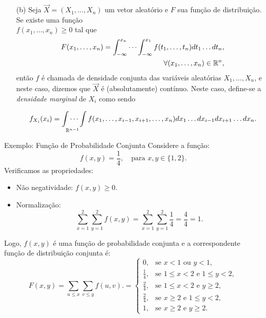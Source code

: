 \begin{frame}
\begin{block}{}

\begin{enumerate}
\item[(b)] Seja $\vec{X}=(X_1,\ldots,X_n)$ um vetor aleatório e $F$ sua função de distribuição. Se existe uma função\\
$f(x_1,\ldots,x_n)\geq 0$ tal que
\begin{eqnarray}
& & F(x_1,\ldots,x_n)=\int_{-\infty}^{x_n}\cdots\int_{-\infty}^{x_1}f(t_1,\ldots,t_n)dt_1\ldots dt_n, \nonumber\\
& &\forall(x_1,\ldots,x_n)\in \mathbb{R}^n,\nonumber
\end{eqnarray}
então $f$ é chamada de densidade conjunta das variáveis aleatórias $X_1,\ldots,X_n$, e neste caso, dizemos que $\vec{X}$ é (absolutamente) contínuo. Neste caso, define-se a {\em densidade marginal} de $X_i$ como sendo

\begin{eqnarray}
& & f_{X_i}(x_i)=\idotsint\limits_{\mathbb{R}^{n-1}} f(x_1,\ldots,x_{i-1},x_{i+1},\ldots,x_n)dx_1\ldots
dx_{i-1}dx_{i+1}\ldots dx_n. \nonumber
\end{eqnarray}
\end{enumerate}

\end{block}
\end{frame}

\begin{frame}{Exemplo: Função de Probabilidade Conjunta}
	Considere a função:
	\[
	f(x, y) = \frac{1}{4}, \quad \text{para } x, y \in \{1, 2\}.
	\]
	Verificamos as propriedades:
	\begin{itemize}
		\item Não negatividade: $f(x, y) \geq 0$.
		\item Normalização:
		\[
		\sum_{x=1}^{2} \sum_{y=1}^{2} f(x, y) = \sum_{x=1}^{2} \sum_{y=1}^{2} \frac{1}{4} = \frac{4}{4} = 1.
		\]
	\end{itemize}
	Logo, $f(x, y)$ é uma função de probabilidade conjunta e a correspondente função de distribuição conjunta é:
	\[
	F(x, y) = \sum_{u \leq x} \sum_{v \leq y} f(u, v). = 
	\begin{cases}
		0, & \text{se } x < 1 \text{ ou } y < 1, \\
		\frac{1}{4}, & \text{se } 1 \leq x < 2 \text{ e } 1 \leq y < 2, \\
		\frac{2}{4}, & \text{se } 1 \leq x < 2 \text{ e } y \geq 2, \\
		\frac{2}{4}, & \text{se } x \geq 2 \text{ e } 1 \leq y < 2, \\
		1, & \text{se } x \geq 2 \text{ e } y \geq 2.
	\end{cases}
	\]
\end{frame}



